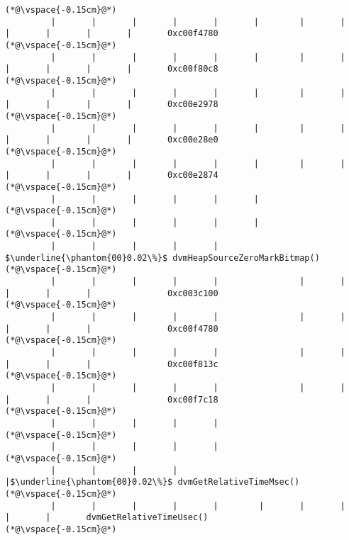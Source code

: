 \begin{lstlisting}[caption=NewDirectByteBuffer, label=profile:C2JNewDirectBuffer-512, numberbychapter=true, frame=lines, float, floatplacement=t]
(*@\vspace{-0.15cm}@*)
         |       |       |       |       |       |        |       |       |       |       |       |       0xc00f4780
(*@\vspace{-0.15cm}@*)
         |       |       |       |       |       |        |       |       |       |       |       |       0xc00f80c8
(*@\vspace{-0.15cm}@*)
         |       |       |       |       |       |        |       |       |       |       |       |       0xc00e2978
(*@\vspace{-0.15cm}@*)
         |       |       |       |       |       |        |       |       |       |       |       |       0xc00e28e0
(*@\vspace{-0.15cm}@*)
         |       |       |       |       |       |        |       |       |       |       |       |       0xc00e2874
(*@\vspace{-0.15cm}@*)
         |       |       |       |       |       |
(*@\vspace{-0.15cm}@*)
         |       |       |       |       |       |
(*@\vspace{-0.15cm}@*)
         |       |       |       |       |        $\underline{\phantom{00}0.02\%}$ dvmHeapSourceZeroMarkBitmap()
(*@\vspace{-0.15cm}@*)
         |       |       |       |       |                |       |       |       |       |               0xc003c100
(*@\vspace{-0.15cm}@*)
         |       |       |       |       |                |       |       |       |       |               0xc00f4780
(*@\vspace{-0.15cm}@*)
         |       |       |       |       |                |       |       |       |       |               0xc00f813c
(*@\vspace{-0.15cm}@*)
         |       |       |       |       |                |       |       |       |       |               0xc00f7c18
(*@\vspace{-0.15cm}@*)
         |       |       |       |       |
(*@\vspace{-0.15cm}@*)
         |       |       |       |       |
(*@\vspace{-0.15cm}@*)
         |       |       |       |       |$\underline{\phantom{00}0.02\%}$ dvmGetRelativeTimeMsec()
(*@\vspace{-0.15cm}@*)
         |       |       |       |       |        |       |       |       |       |       dvmGetRelativeTimeUsec()
(*@\vspace{-0.15cm}@*)

\end{lstlisting}
